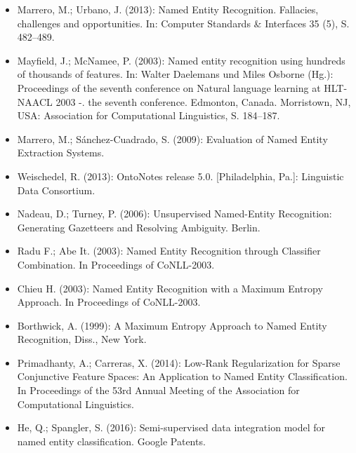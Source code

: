 \documentclass{beamer}
\begin{document}
	\begin{frame}
		\begin{itemize}
			\item Marrero, M.; Urbano, J. (2013): Named Entity Recognition. Fallacies, challenges and opportunities. In: Computer Standards \& Interfaces 35 (5), S. 482–489.\\
			\item Mayfield, J.; McNamee, P. (2003): Named entity recognition using hundreds of thousands of features. In: Walter Daelemans und Miles Osborne (Hg.): Proceedings of the seventh conference on Natural language learning at HLT-NAACL 2003 -. the seventh conference. Edmonton, Canada. Morristown, NJ, USA: Association for Computational Linguistics, S. 184–187.\\
			\item Marrero, M.; Sánchez-Cuadrado, S. (2009): Evaluation of Named Entity Extraction Systems.\\
			\item Weischedel, R. (2013): OntoNotes release 5.0. [Philadelphia, Pa.]: Linguistic Data Consortium.\\
			\item Nadeau, D.; Turney, P. (2006): Unsupervised Named-Entity Recognition: Generating Gazetteers and Resolving Ambiguity. Berlin.
		\end{itemize}
	\end{frame}
	\begin{frame}
			\begin{itemize}
				\item Radu F.; Abe It. (2003):  Named Entity Recognition
				through Classifier Combination. In
				Proceedings of 	CoNLL-2003.
				\item Chieu H. (2003): Named Entity Recognition with a Maximum Entropy Approach. In Proceedings of CoNLL-2003.
				\item Borthwick, A. (1999): A
				Maximum Entropy Approach to Named Entity Recognition, Diss., New York.\\
				\item Primadhanty, A.; Carreras, X. (2014): Low-Rank Regularization for Sparse Conjunctive Feature Spaces:
				An Application to Named Entity Classification. In Proceedings of the 53rd Annual Meeting of the Association for Computational Linguistics.
				\item He, Q.; Spangler, S. (2016): Semi-supervised data integration model for named entity classification. Google Patents.
			\end{itemize}
	\end{frame}
\end{document}
